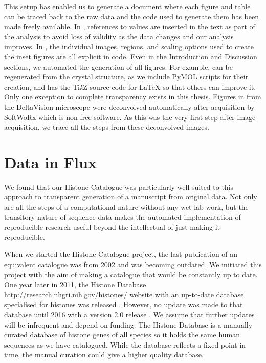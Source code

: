 This setup has enabled us to generate a document where each
figure and table can be traced back to the raw
data and the code used to generate them has been made freely
available.
In
, references to values are inserted in the
text as part of the analysis to avoid loss of validity as the data
changes and our analysis improves.  In , the
individual images, regions, and scaling options used to create the
inset figures are all explicit in code.  Even in the Introduction and
Discussion sections, we
automated the generation of all figures.  For example,
 can be regenerated from the
crystal structure, as we include PyMOL
scripts for their creation, and
 has the Ti\textit{k}Z source code
for \LaTeX{} so that
others can improve it.  Only one exception to complete transparency
exists in this thesis.  Figures in
 from the DeltaVision microscope were deconvolved
automatically after
acquisition by SoftWoRx which is non-free software.
As this was the very first step
after image acquisition, we trace all the steps from these
deconvolved images.


\section{Data in Flux}

We found that our Histone Catalogue 
was particularly well suited
to this approach to transparent generation of a manuscript from
original data.  Not only are all the steps of a computational
nature without any wet-lab work, but the transitory nature of sequence data
makes the automated implementation of reproducible research useful
beyond the intellectual of just making it reproducible.

When we started the Histone Catalogue project, the last publication of
an equivalent catalogue
was from 2002 and was becoming outdated.  We initiated
this project with the aim of making a catalogue that would be
constantly up to date.  One year later in 2011, the Histone Database
\url{http://research.nhgri.nih.gov/histones/}
website with an up-to-date database specialised for histones
was released \citep{histonedb-2011}.
However, no update was made to that database until 2016 with a version 2.0
release \citep{histonedb-2016}.
We assume that further updates will
be infrequent and depend on funding.
The Histone Database is a manually curated database of histone
genes of all species so it holds the same human sequences as we have
catalogued.  While the database reflects a fixed point in time,
the manual curation could give a higher quality database.

